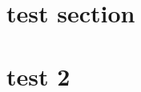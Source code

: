 \documentclass{article}
\begin{document}
\section*{test section}



\section*{test 2}


\end{document}
